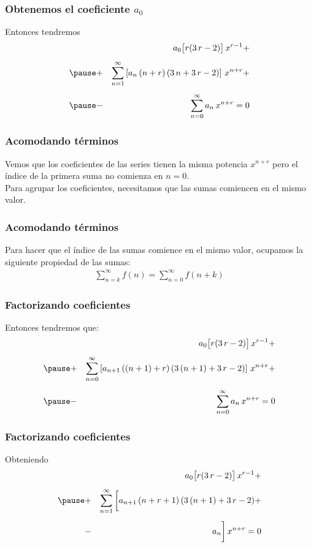 \begin{frame}
\frametitle{Obtenemos el coeficiente $a_{0}$}
Entonces tendremos
\begin{eqnarray*}
&{}& a_{0} \big[ r (3 \, r - 2) \big] \, x^{r-1} + \\[0.5em] \pause
&+& \sum_{n=1}^{\infty} \left[  a_{n} \, (n + r) \, (3 \, n + 3 \, r - 2) \right] \, x^{n+r} + \\[0.5em] \pause
&-& \sum_{n=0}^{\infty} a_{n} \, x^{n+r} = 0
\end{eqnarray*}
\end{frame}
\begin{frame}
\frametitle{Acomodando términos}
Vemos que los coeficientes de las series tienen la misma potencia $x^{n+r}$ pero el índice de la primera suma no comienza en $n=0$.
\\
\bigskip
\pause
Para agrupar los coeficientes, necesitamos que las sumas comiencen en el mismo valor.
\end{frame}
\begin{frame}
\frametitle{Acomodando términos}
Para hacer que el índice de las sumas comience en el mismo valor, ocupamos la siguiente propiedad de las sumas:
\begin{align*}
\sum_{n=k}^{\infty} f(n) = \sum_{n=0}^{\infty} f(n+k)
\end{align*}
\end{frame}
\begin{frame}
\frametitle{Factorizando coeficientes}
Entonces tendremos que:
\begin{eqnarray*}
&{}& a_{0} \big[ r (3 \, r - 2) \big] \, x^{r-1} + \\[0.5em] \pause
&+& \sum_{n=0}^{\infty} \left[  a_{n+1} \, ((n + 1) + r) \, (3 \, (n + 1) + 3 \, r - 2) \right] \, x^{n+r} + \\[0.5em] \pause
&-& \sum_{n=0}^{\infty} a_{n} \, x^{n+r} = 0   
\end{eqnarray*}
\end{frame}
\begin{frame}
\frametitle{Factorizando coeficientes}
Obteniendo
\begin{eqnarray*}
&{}& a_{0} \big[ r (3 \, r - 2) \big] \, x^{r-1} + \\[0.5em] \pause
&+& \sum_{n=1}^{\infty} \bigg[  a_{n+1} \, (n + r + 1) \, (3 \, (n + 1) + 3 \, r - 2) + \\[0.5em]
&-& a_{n} \bigg] \, x^{n+r} = 0
\end{eqnarray*}
\end{frame}
